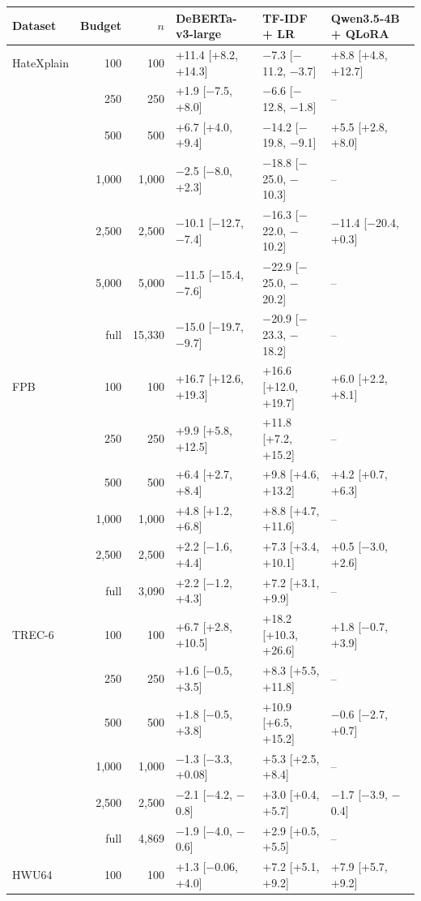 \begin{tabular}{lrrlll}
\toprule
Dataset & Budget & $n$ & DeBERTa-v3-large & TF-IDF + LR & Qwen3.5-4B + QLoRA \\
\midrule
HateXplain & 100 & 100 & +11.4 [+8.2, +14.3] & $-$7.3 [$-$11.2, $-$3.7] & +8.8 [+4.8, +12.7] \\
 & 250 & 250 & +1.9 [$-$7.5, +8.0] & $-$6.6 [$-$12.8, $-$1.8] & -- \\
 & 500 & 500 & +6.7 [+4.0, +9.4] & $-$14.2 [$-$19.8, $-$9.1] & +5.5 [+2.8, +8.0] \\
 & 1{,}000 & 1{,}000 & $-$2.5 [$-$8.0, +2.3] & $-$18.8 [$-$25.0, $-$10.3] & -- \\
 & 2{,}500 & 2{,}500 & $-$10.1 [$-$12.7, $-$7.4] & $-$16.3 [$-$22.0, $-$10.2] & $-$11.4 [$-$20.4, +0.3] \\
 & 5{,}000 & 5{,}000 & $-$11.5 [$-$15.4, $-$7.6] & $-$22.9 [$-$25.0, $-$20.2] & -- \\
 & full & 15{,}330 & $-$15.0 [$-$19.7, $-$9.7] & $-$20.9 [$-$23.3, $-$18.2] & -- \\
\midrule
FPB & 100 & 100 & +16.7 [+12.6, +19.3] & +16.6 [+12.0, +19.7] & +6.0 [+2.2, +8.1] \\
 & 250 & 250 & +9.9 [+5.8, +12.5] & +11.8 [+7.2, +15.2] & -- \\
 & 500 & 500 & +6.4 [+2.7, +8.4] & +9.8 [+4.6, +13.2] & +4.2 [+0.7, +6.3] \\
 & 1{,}000 & 1{,}000 & +4.8 [+1.2, +6.8] & +8.8 [+4.7, +11.6] & -- \\
 & 2{,}500 & 2{,}500 & +2.2 [$-$1.6, +4.4] & +7.3 [+3.4, +10.1] & +0.5 [$-$3.0, +2.6] \\
 & full & 3{,}090 & +2.2 [$-$1.2, +4.3] & +7.2 [+3.1, +9.9] & -- \\
\midrule
TREC-6 & 100 & 100 & +6.7 [+2.8, +10.5] & +18.2 [+10.3, +26.6] & +1.8 [$-$0.7, +3.9] \\
 & 250 & 250 & +1.6 [$-$0.5, +3.5] & +8.3 [+5.5, +11.8] & -- \\
 & 500 & 500 & +1.8 [$-$0.5, +3.8] & +10.9 [+6.5, +15.2] & $-$0.6 [$-$2.7, +0.7] \\
 & 1{,}000 & 1{,}000 & $-$1.3 [$-$3.3, +0.08] & +5.3 [+2.5, +8.4] & -- \\
 & 2{,}500 & 2{,}500 & $-$2.1 [$-$4.2, $-$0.8] & +3.0 [+0.4, +5.7] & $-$1.7 [$-$3.9, $-$0.4] \\
 & full & 4{,}869 & $-$1.9 [$-$4.0, $-$0.6] & +2.9 [+0.5, +5.5] & -- \\
\midrule
HWU64 & 100 & 100 & +1.3 [$-$0.06, +4.0] & +7.2 [+5.1, +9.2] & +7.9 [+5.7, +9.2] \\

\end{tabular}
